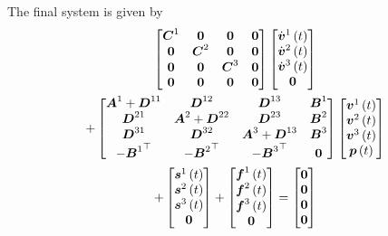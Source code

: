 The final system is given by
\begin{multline}
  \begin{bmatrix}
    \matr{C}^{1} & \matr{0} & \matr{0} & \matr{0} \\
    \matr{0} & \matr{C}^{2} & \matr{0} & \matr{0} \\
    \matr{0} & \matr{0} & \matr{C}^{3} & \matr{0} \\
    \matr{0} & \matr{0} & \matr{0} & \matr{0}
  \end{bmatrix}\begin{bmatrix}
      \fnof{\dot{\vectr{v}}^{1}}{t} \\
      \fnof{\dot{\vectr{v}}^{2}}{t} \\
      \fnof{\dot{\vectr{v}}^{3}}{t} \\
      \vectr{0}
  \end{bmatrix}\\
  +\begin{bmatrix}
     \matr{A}^{1}+\matr{D}^{11} & \matr{D}^{12} & \matr{D}^{13} & \matr{B}^{1}\\
     \matr{D}^{21} & \matr{A}^{2}+\matr{D}^{22} & \matr{D}^{23} & \matr{B}^{2}\\
     \matr{D}^{31} & \matr{D}^{32} & \matr{A}^{3}+\matr{D}^{13} & \matr{B}^{3}\\
     -\transpose{\matr{B}^{1}} & -\transpose{\matr{B}^{2}} & -\transpose{\matr{B}^{3}} & \matr{0}
  \end{bmatrix}\begin{bmatrix}
    \fnof{\vectr{v}^{1}}{t} \\
    \fnof{\vectr{v}^{2}}{t} \\
    \fnof{\vectr{v}^{3}}{t} \\
    \fnof{\vectr{p}}{t}
  \end{bmatrix}\\
  +\begin{bmatrix}
    \fnof{\vectr{s}^{1}}{t} \\
    \fnof{\vectr{s}^{2}}{t} \\
    \fnof{\vectr{s}^{3}}{t} \\
    \vectr{0}
  \end{bmatrix}+\begin{bmatrix}
    \fnof{\vectr{f}^{1}}{t} \\
    \fnof{\vectr{f}^{2}}{t} \\
    \fnof{\vectr{f}^{3}}{t} \\
    \vectr{0}
  \end{bmatrix}=\begin{bmatrix}
  \vectr{0} \\
  \vectr{0} \\
  \vectr{0} \\
  \vectr{0}
  \end{bmatrix}
\end{multline}
